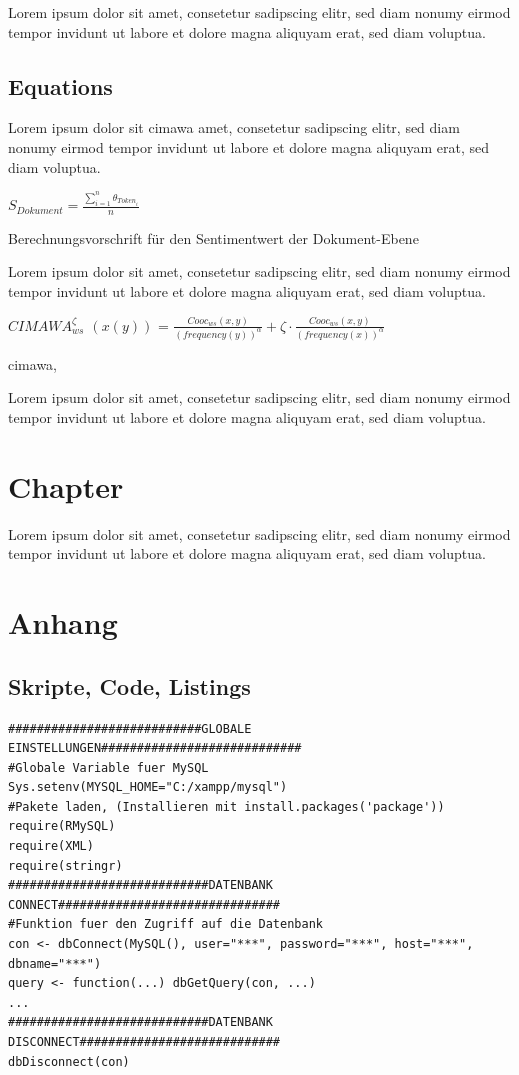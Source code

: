 \documentclass[
        ngerman,
        paper=a4,
        numbers=noendperiod,
]{scrreprt}
\begin{document}
Lorem ipsum dolor sit amet, consetetur sadipscing elitr, sed diam nonumy eirmod tempor invidunt ut labore et dolore magna aliquyam erat, sed diam voluptua.

\section{Equations}
Lorem ipsum dolor sit \ac{cimawa} amet, consetetur sadipscing elitr, sed diam nonumy eirmod tempor invidunt ut labore et dolore magna aliquyam erat, sed diam voluptua.
\begin{xequation-} 
\centering $S_{Dokument}= \frac{\sum_{i=1}^n{\theta_{{Token}_i}}}{n}$
\caption[Berechnungsvorschrift für den Sentimentwert der Dokument-Ebene]{Berechnungsvorschrift für den Sentimentwert der Dokument-Ebene} 
\end{xequation-} 
Lorem ipsum dolor sit amet, consetetur sadipscing elitr, sed diam nonumy eirmod tempor invidunt ut labore et dolore magna aliquyam erat, sed diam voluptua.
\begin{xequation-} 
\centering \textit{$CIMAWA_{ws}^\zeta$ $(x(y))$} = $\frac{Cooc_{ws}(x,y)}{(frequency(y))^\alpha} + \zeta \cdot \frac{Cooc_{ws}(x,y)}{(frequency(x))^\alpha}$
\caption[CIMAWA]{\ac{cimawa}, \cite []{eff70}} 
\end{xequation-}
Lorem ipsum dolor sit amet, consetetur sadipscing elitr, sed diam nonumy eirmod tempor invidunt ut labore et dolore magna aliquyam erat, sed diam voluptua.
\chapter{Chapter}
Lorem ipsum dolor sit amet, consetetur sadipscing elitr, sed diam nonumy eirmod tempor invidunt ut labore et dolore magna aliquyam erat, sed diam voluptua.
\appendix 
\chapter{Anhang}
\label{chapter:Anhang}%
\section{Skripte, Code, Listings}
\label{section:scripts} %
\begin{lstlisting}
###########################GLOBALE EINSTELLUNGEN############################
#Globale Variable fuer MySQL
Sys.setenv(MYSQL_HOME="C:/xampp/mysql")
#Pakete laden, (Installieren mit install.packages('package'))
require(RMySQL)
require(XML)
require(stringr)
############################DATENBANK CONNECT###############################
#Funktion fuer den Zugriff auf die Datenbank
con <- dbConnect(MySQL(), user="***", password="***", host="***", dbname="***")
query <- function(...) dbGetQuery(con, ...)
...
############################DATENBANK DISCONNECT############################
dbDisconnect(con)
\end{lstlisting}
\end{document}
